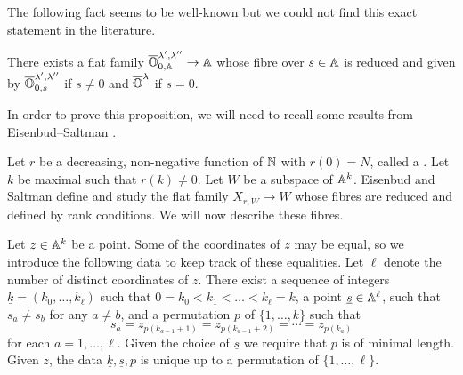 \documentclass{article}
\begin{document}
The following fact seems to be well-known but we could not find this exact statement in the literature.
\begin{proposition}\label{prop:adjoint}
    There exists a flat family $\overline{\OO}^{\lambda', \lambda''}_{0,\AA} \rightarrow \AA$ whose fibre over $s \in \AA$ is reduced and given by $\overline{\OO}^{\lambda', \lambda''}_{0,s}$ if $s \ne 0 $ and $\overline{\OO}^\lambda $ if $ s = 0$.
\end{proposition}
% 
In order to prove this proposition, we will need to recall some results from Eisenbud--Saltman \cite{eisenbud1989rank}. 
% 

Let $ r $ be a decreasing, non-negative function of $\NN$ with $r(0) = N$, called a .  Let $k $ be maximal such that $ r(k) \ne 0 $.
% 
Let $ W$ be a subspace of $ \AA^k$. Eisenbud and Saltman define and study the flat family $ X_{r,W} \rightarrow W$ whose fibres are reduced and defined by rank conditions. We will now describe these fibres. 

Let $ z \in \AA^k$ be a point. Some of the coordinates of $z$ may be equal, so we introduce the following data to keep track of these equalities. Let $ \ell$ denote the number of distinct coordinates of $ z $. There exist a sequence of integers $\underline{k} = (k_0,\dots,k_\ell)$ such that $ 0=k_0< k_1< \dots < k_\ell = k $, a point $ \underline s \in\AA^\ell$, such that $s_a\ne s_b$ for any $a\ne b$, and a permutation  $ p $ of $ \{1, \dots, k\}$ such that 
$$ 
    s_a = z_{p(k_{a-1}+1)} = z_{p(k_{a-1} + 2)} =  \cdots = z_{p(k_a)}
$$ 
for each $a = 1,\dots,\ell$. 
Given the choice of $ \underline s$ we require that $ p $ is of minimal length. 
Given $z$, the data $\underline{k}, \underline s, p$ is unique up to a permutation of $ \{1, \dots, \ell\}$.
% 
\end{document}
